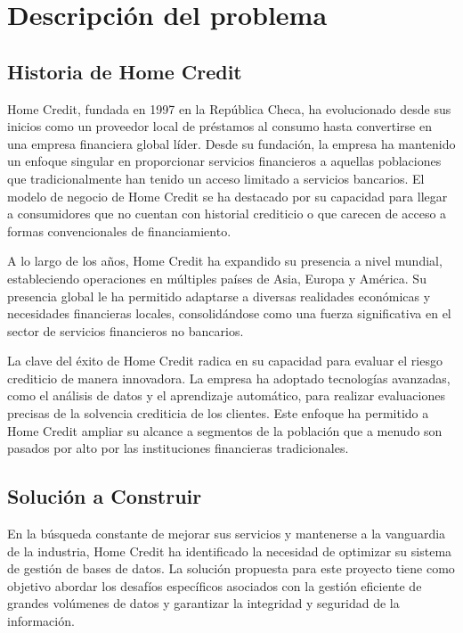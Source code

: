 \section{Descripción del problema}

\subsection{Historia de Home Credit}

Home Credit, fundada en 1997 en la República Checa, ha evolucionado desde sus
inicios como un proveedor local de préstamos al consumo hasta convertirse en una
empresa financiera global líder. Desde su fundación, la empresa ha mantenido un
enfoque singular en proporcionar servicios financieros a aquellas poblaciones
que tradicionalmente han tenido un acceso limitado a servicios bancarios. El
modelo de negocio de Home Credit se ha destacado por su capacidad para llegar a
consumidores que no cuentan con historial crediticio o que carecen de acceso a
formas convencionales de financiamiento.

A lo largo de los años, Home Credit ha expandido su presencia a nivel mundial,
estableciendo operaciones en múltiples países de Asia, Europa y América. Su
presencia global le ha permitido adaptarse a diversas realidades económicas y
necesidades financieras locales, consolidándose como una fuerza significativa en
el sector de servicios financieros no bancarios.

La clave del éxito de Home Credit radica en su capacidad para evaluar el riesgo
crediticio de manera innovadora. La empresa ha adoptado tecnologías avanzadas,
como el análisis de datos y el aprendizaje automático, para realizar
evaluaciones precisas de la solvencia crediticia de los clientes. Este enfoque
ha permitido a Home Credit ampliar su alcance a segmentos de la población que a
menudo son pasados por alto por las instituciones financieras tradicionales.

\subsection{Solución a Construir}

En la búsqueda constante de mejorar sus servicios y mantenerse a la vanguardia
de la industria, Home Credit ha identificado la necesidad de optimizar su
sistema de gestión de bases de datos. La solución propuesta para este proyecto
tiene como objetivo abordar los desafíos específicos asociados con la gestión
eficiente de grandes volúmenes de datos y garantizar la integridad y seguridad
de la información.

